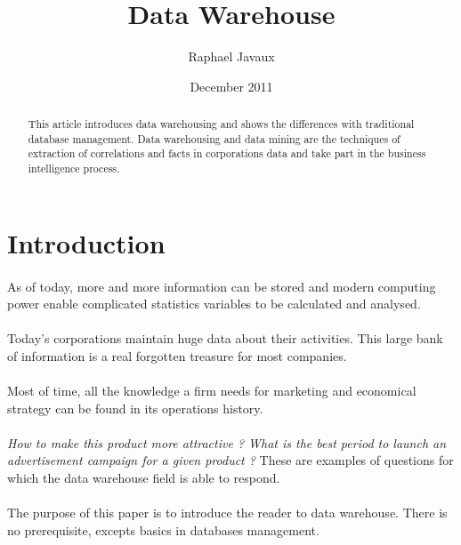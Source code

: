 \documentclass[a4paper,12pt]{article}
\title{Data Warehouse}
\author{Raphael Javaux}
\date{December 2011}
\begin{document}
\maketitle

\begin{abstract}
   This article introduces data warehousing and shows the differences with
traditional database management. Data warehousing and data mining are the
techniques of extraction of correlations and facts in corporations data and
take part in the business intelligence process.
\end{abstract}

\newpage

\tableofcontents
\newpage

\section{Introduction}
    \paragraph{}
    As of today, more and more information can be stored and modern computing
power enable complicated statistics variables to be calculated and analysed.

    \paragraph{}
    Today's corporations maintain huge data about their activities. This
large bank of information is a real forgotten treasure for most companies.

    \paragraph{}
    Most of time, all the knowledge a firm needs for marketing and economical
strategy can be found in its operations history.

    \paragraph{}
    \textit{How to make this product more attractive ? What is the best
period to launch an advertisement campaign for a given product ?} These are
examples of questions for which the data warehouse field is able to respond.

    \paragraph{}
    The purpose of this paper is to introduce the reader to data warehouse.
There is no prerequisite, excepts basics in databases management.
\end{document}
